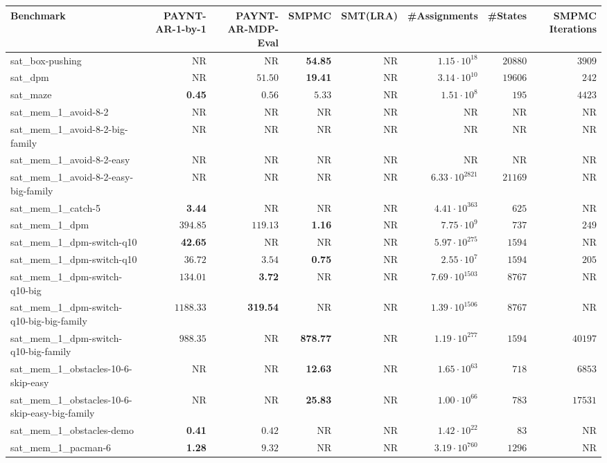 \begin{tabular}{lrrrrrrr}
\toprule
Benchmark & PAYNT-AR-1-by-1 & PAYNT-AR-MDP-Eval & SMPMC & SMT(LRA) & \#Assignments & \#States & SMPMC Iterations \\
\midrule
sat\_box-pushing & NR & NR & \textbf{54.85} & NR & $1.15\cdot 10^{18}$ & $20880$ & $3909$ \\
sat\_dpm & NR & $51.50$ & \textbf{19.41} & NR & $3.14\cdot 10^{10}$ & $19606$ & $242$ \\
sat\_maze & \textbf{0.45} & $0.56$ & $5.33$ & NR & $1.51\cdot 10^{8}$ & $195$ & $4423$ \\
sat\_mem\_1\_avoid-8-2 & NR & NR & NR & NR & NR & NR & NR \\
sat\_mem\_1\_avoid-8-2-big-family & NR & NR & NR & NR & NR & NR & NR \\
sat\_mem\_1\_avoid-8-2-easy & NR & NR & NR & NR & NR & NR & NR \\
sat\_mem\_1\_avoid-8-2-easy-big-family & NR & NR & NR & NR & $6.33\cdot 10^{2821}$ & $21169$ & NR \\
sat\_mem\_1\_catch-5 & \textbf{3.44} & NR & NR & NR & $4.41\cdot 10^{363}$ & $625$ & NR \\
sat\_mem\_1\_dpm & $394.85$ & $119.13$ & \textbf{1.16} & NR & $7.75\cdot 10^{9}$ & $737$ & $249$ \\
sat\_mem\_1\_dpm-switch-q10 & \textbf{42.65} & NR & NR & NR & $5.97\cdot 10^{275}$ & $1594$ & NR \\
sat\_mem\_1\_dpm-switch-q10 & $36.72$ & $3.54$ & \textbf{0.75} & NR & $2.55\cdot 10^{7}$ & $1594$ & $205$ \\
sat\_mem\_1\_dpm-switch-q10-big & $134.01$ & \textbf{3.72} & NR & NR & $7.69\cdot 10^{1503}$ & $8767$ & NR \\
sat\_mem\_1\_dpm-switch-q10-big-big-family & $1188.33$ & \textbf{319.54} & NR & NR & $1.39\cdot 10^{1506}$ & $8767$ & NR \\
sat\_mem\_1\_dpm-switch-q10-big-family & $988.35$ & NR & \textbf{878.77} & NR & $1.19\cdot 10^{277}$ & $1594$ & $40197$ \\
sat\_mem\_1\_obstacles-10-6-skip-easy & NR & NR & \textbf{12.63} & NR & $1.65\cdot 10^{63}$ & $718$ & $6853$ \\
sat\_mem\_1\_obstacles-10-6-skip-easy-big-family & NR & NR & \textbf{25.83} & NR & $1.00\cdot 10^{66}$ & $783$ & $17531$ \\
sat\_mem\_1\_obstacles-demo & \textbf{0.41} & $0.42$ & NR & NR & $1.42\cdot 10^{22}$ & $83$ & NR \\
sat\_mem\_1\_pacman-6 & \textbf{1.28} & $9.32$ & NR & NR & $3.19\cdot 10^{760}$ & $1296$ & NR \\

\end{tabular}
